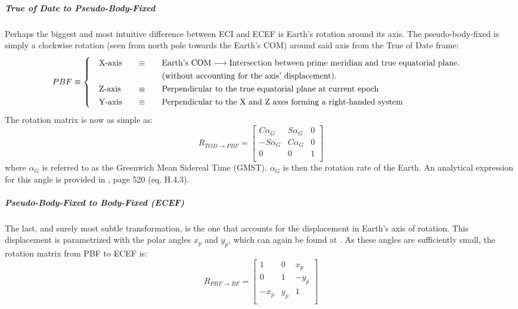 		\subparagraph{True of Date to Pseudo-Body-Fixed\\}
		\indent Perhaps the biggest and most intuitive difference between ECI and ECEF is Earth's rotation around its axis. The pseudo-body-fixed is simply a clockwise rotation (seen from north pole towards the Earth's COM) around said axis from the True of Date frame:  \\
		\[
		\arraycolsep=10pt
		\def\arraystretch{1.3}
		PBF\equiv\left\{
		\begin{array}{lll}
		\text{X-axis} 	& \equiv 	& \text{Earth's COM} \longrightarrow \text{Intersection between prime meridian and true equatorial plane.} \\
		 				&  	 		& \text{(without accounting for the axis' displacement).} \\
		\text{Z-axis} 	& \equiv 	& \text{Perpendicular to the true equatorial plane at current epoch} \\
		\text{Y-axis} 	& \equiv 	& \text{Perpendicular to the X and Z axes forming a right-handed system} \\
		\end{array}
		\right.
		\]
		\indent The rotation matrix is now as simple as:
		\begin{equation}
		R_{TOD\rightarrow PBF} = 
		\left[ 
		\begin{array}{ccc}
		C \alpha_G 		& S\alpha_G 	& 0 \\
		-S\alpha_G 		& C\alpha_G 	& 0 \\
		0 				& 0 			& 1 \\
		\end{array}
		\right]
		\label{eq: R_TOD_PBF}
		\end{equation}
		\noindent where $\alpha_G$ is referred to as the Greenwich Mean Sidereal Time (GMST). $\dot{\alpha_G}$ is then the rotation rate of the Earth. An analytical expression for this angle is provided in \cite{Tapley}, page 520 (eq. H.4.3).
		\subparagraph{Pseudo-Body-Fixed to Body-Fixed (ECEF)\\}
		\indent The last, and surely most subtle transformation, is the one that accounts for the displacement in Earth's axis of rotation. This displacement is parametrized with the polar angles $x_p$ and $y_p$, which can again be found at \cite{IERS_conventions}. As these angles are sufficiently small, the rotation matrix from PBF to ECEF is:\\
		\begin{equation}
		R_{PBF\rightarrow BF} = 
		\left[ 
		\begin{array}{ccc}
		1		& 0 	& x_p \\
		0 		& 1 	& -y_p \\
		-x_p 	& y_p 	& 1 \\
		\end{array}
		\right]
		\label{eq: R_PBF_ECEF}
		\end{equation}
